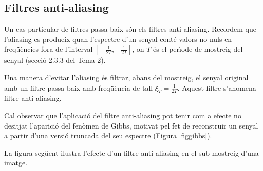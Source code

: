 \documentclass{article}
\begin{document}
\subsection{Filtres anti-aliasing}
Un cas particular de filtres passa-baix s\'on els filtres anti-aliasing.
Recordem que l'aliasing es produeix quan l'espectre d'un senyal cont\'e  
valors no nuls en freq\"u\`encies fora de l'interval $[-\frac{1}{2T},+\frac{1}{2T}]$, 
on $T$ \'es el per\'\i ode de mostreig del senyal (secci\'o 2.3.3 del Tema 2).


Una manera d'evitar l'aliasing \'es filtrar, abans del mostreig, el senyal original
amb un filtre passa-baix amb freq\"u\`encia de tall $\xi_T=\frac{1}{2T}$. Aquest
filtre s'anomena filtre anti-aliasing.
 
Cal observar que l'aplicaci\'o del filtre anti-aliasing pot tenir com a efecte 
no desitjat l'aparici\'o del fen\`omen de Gibbs, motivat pel fet de reconstruir 
un senyal a partir d'una versi\'o truncada del seu espectre (Figura \ref{figgibbs}).

La figura seg\"uent ilustra l'efecte d'un filtre anti-aliasing en el sub-mostreig 
d'una imatge.
\end{document}

